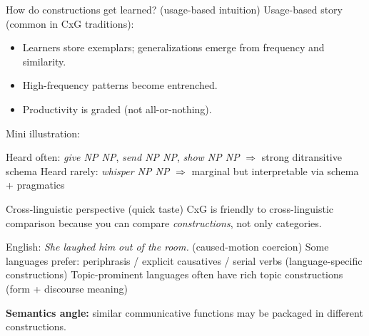 \begin{frame}{How do constructions get learned? (usage-based intuition)}
\small
Usage-based story (common in CxG traditions):
\begin{itemize}
  \item Learners store exemplars; generalizations emerge from frequency and similarity.
  \item High-frequency patterns become entrenched.
  \item Productivity is graded (not all-or-nothing).
\end{itemize}

\vspace{0.75em}
Mini illustration:

\begin{exe}
  \ex Heard often: \emph{give NP NP}, \emph{send NP NP}, \emph{show NP NP} $\Rightarrow$ strong ditransitive schema
  \ex Heard rarely: \emph{whisper NP NP} $\Rightarrow$ marginal but interpretable via schema + pragmatics
\end{exe}

\end{frame}

\begin{frame}{Cross-linguistic perspective (quick taste)}
\small
CxG is friendly to cross-linguistic comparison because you can compare \emph{constructions}, not only categories.


\begin{exe}
  \ex English: \emph{She laughed him out of the room.} (caused-motion coercion)
  \ex Some languages prefer: periphrasis / explicit causatives / serial verbs (language-specific constructions)
  \ex Topic-prominent languages often have rich topic constructions (form + discourse meaning)
\end{exe}


\vspace{0.5em}
\textbf{Semantics angle:} similar communicative functions may be packaged in different constructions.
\end{frame}

